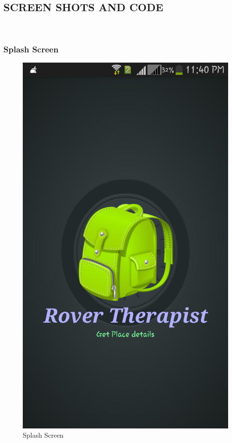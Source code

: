 \documentclass[12pt,a4paper]{article}
\begin{document}
\subsection{SCREEN SHOTS AND CODE}
\\
\subsubsection{Splash Screen}
\begin{figure}[!htb]
\centering
\includegraphics[width=12 cm]{splash}
\caption{Splash Screen}
\end{figure}
\\
\end{document}

